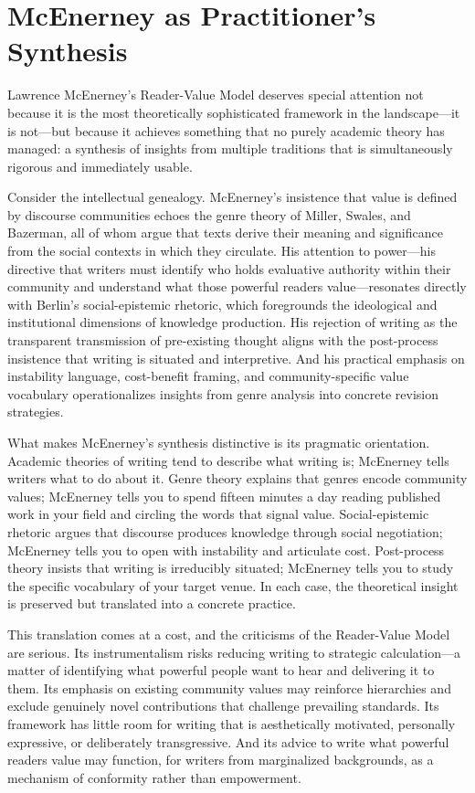\documentclass[12pt]{article}
\begin{document}
\section{McEnerney as Practitioner's Synthesis}

Lawrence McEnerney's Reader-Value Model deserves special attention not because it is the most theoretically sophisticated framework in the landscape---it is not---but because it achieves something that no purely academic theory has managed: a synthesis of insights from multiple traditions that is simultaneously rigorous and immediately usable.

Consider the intellectual genealogy. McEnerney's insistence that value is defined by discourse communities echoes the genre theory of Miller, Swales, and Bazerman, all of whom argue that texts derive their meaning and significance from the social contexts in which they circulate. His attention to power---his directive that writers must identify who holds evaluative authority within their community and understand what those powerful readers value---resonates directly with Berlin's social-epistemic rhetoric, which foregrounds the ideological and institutional dimensions of knowledge production. His rejection of writing as the transparent transmission of pre-existing thought aligns with the post-process insistence that writing is situated and interpretive. And his practical emphasis on instability language, cost-benefit framing, and community-specific value vocabulary operationalizes insights from genre analysis into concrete revision strategies.

What makes McEnerney's synthesis distinctive is its pragmatic orientation. Academic theories of writing tend to describe what writing is; McEnerney tells writers what to do about it. Genre theory explains that genres encode community values; McEnerney tells you to spend fifteen minutes a day reading published work in your field and circling the words that signal value. Social-epistemic rhetoric argues that discourse produces knowledge through social negotiation; McEnerney tells you to open with instability and articulate cost. Post-process theory insists that writing is irreducibly situated; McEnerney tells you to study the specific vocabulary of your target venue. In each case, the theoretical insight is preserved but translated into a concrete practice.

This translation comes at a cost, and the criticisms of the Reader-Value Model are serious. Its instrumentalism risks reducing writing to strategic calculation---a matter of identifying what powerful people want to hear and delivering it to them. Its emphasis on existing community values may reinforce hierarchies and exclude genuinely novel contributions that challenge prevailing standards. Its framework has little room for writing that is aesthetically motivated, personally expressive, or deliberately transgressive. And its advice to write what powerful readers value may function, for writers from marginalized backgrounds, as a mechanism of conformity rather than empowerment.
\end{document}
